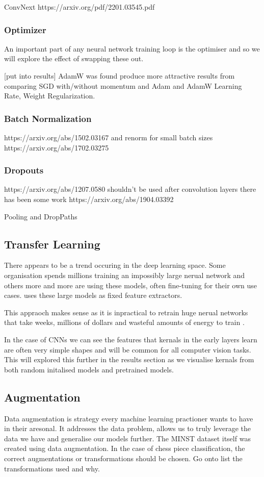 ConvNext https://arxiv.org/pdf/2201.03545.pdf

\subsubsection{Optimizer}
An important part of any neural network training loop is the optimiser and so we will explore the effect of swapping these out.

[put into results]
AdamW was found produce more attractive results from comparing SGD with/without momentum and Adam and AdamW \cite{}
Learning Rate, Weight Regularization.

\subsubsection{Batch Normalization}
https://arxiv.org/abs/1502.03167 and renorm for small batch sizes https://arxiv.org/abs/1702.03275

\subsubsection{Dropouts}
https://arxiv.org/abs/1207.0580 shouldn't be used after convolution layers \cite{} there has been some work https://arxiv.org/abs/1904.03392

Pooling and DropPaths

\subsection{Transfer Learning}
There appears to be a trend occuring in the deep learning space.  Some organisation spends millions training an impossibly large nerual network
and others more and more are using these models, often fine-tuning for their own use cases.  \cite{} uses these large models as fixed feature extractors.

This appraoch makes sense as it is inpractical to retrain huge nerual networks that take weeks, millions of dollars and wasteful amounts of energy
to train \cite{}.

In the case of CNNs we can see the features that kernals in the early layers learn \cite{} are often very simple shapes and will be common for all
computer vision tasks.  This will explored this further in the results section as we visualise kernals from both random initalised models and 
pretrained models.

\subsection{Augmentation}
Data augmentation is strategy every machine learning practioner wants to have in their aresonal.  It addresses the data problem, allows us to truly 
leverage the data we have and generalise our models further.  The MINST \cite{} dataset itself was created using data augmentation.
In the case of chess piece classification, the correct augmentations or transformations should be chosen.
Go onto list the transformations used and why.

